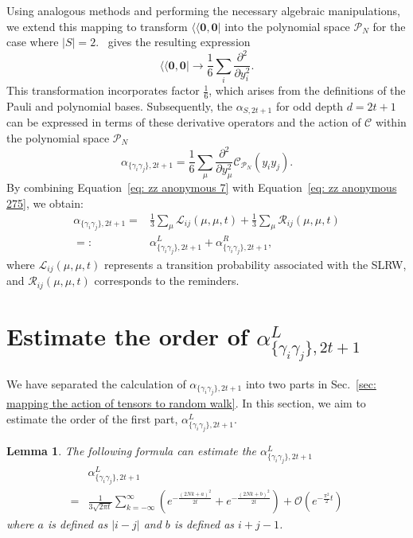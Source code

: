 \documentclass[showpacs,twocolumn,aps,prx,long bibliography,superscriptaddress,notitlepage]{revtex4-1}
\newtheorem{lemma}{Lemma}
\newcommand{\alpl}{\alpha_{\{\gamma_i\gamma_j\}, 2t+1}^{L}}
\newcommand{\supbra}[1]{\langle\langle #1 |}
\begin{document}
Using analogous methods and performing the necessary algebraic manipulations, we extend this mapping to transform \(\supbra{\bm{0}, \bm{0}}\) into the polynomial space \(\mathcal{P}_N\) for the case where \(|S| = 2\). \ gives the resulting expression \begin{equation}
    \supbra{\bm 0,\bm 0} \to \frac{1}{6} \sum_{i} \frac{\partial^2}{\partial y_i^2 }.
\end{equation}
This transformation incorporates factor \(\frac{1}{6}\), which arises from the definitions of the Pauli and polynomial bases. Subsequently, the \(\alpha_{S,2t+1}\) for odd depth \(d = 2t + 1\) can be expressed in terms of these derivative operators and the action of \(\mathcal{C}\) within the polynomial space \(\mathcal{P}_N\)
\begin{equation}
    \alpha_{\{\gamma_i\gamma_j\},2t+1} = \frac{1}{6} \sum_{\mu} \frac{\partial^2}{\partial y_\mu^2 } \mathcal{C}_{\mathcal{P}_N} (y_i y_j).
    \label{eq: zz anonymous 275}
\end{equation}
By combining Equation~\eqref{eq: zz anonymous 7} with Equation~\eqref{eq: zz anonymous 275}, we obtain:
\begin{align}
    \alpha_{\{\gamma_i\gamma_j\},2t+1} =& \frac{1}{3} \sum_\mu \mathscr{L}_{ij} (\mu, \mu, t) + \frac{1}{3} \sum_\mu \mathscr{R}_{ij} (\mu, \mu, t) \\
    =:&  \alpha_{\{\gamma_i\gamma_j\}, 2t+1}^{L} + \alpha_{\{\gamma_i\gamma_j\}, 2t+1}^{R},
    \label{eq: zz anonymous 24}
\end{align}
where \(\mathscr{L}_{ij} (\mu, \mu, t)\) represents a transition probability associated with the SLRW, and \(\mathscr{R}_{ij} (\mu, \mu, t)\) corresponds to the reminders. 

\section{Estimate the order of $\alpha_{\{\gamma_i\gamma_j\}, 2t+1}^{L}$}
\label{sec: estimate the order of alpl}
We have separated the calculation of $\alpha_{\{\gamma_i\gamma_j\},2t+1}$ into two parts in Sec.~\ref{sec: mapping the action of tensors to random walk}. In this section, we aim to estimate the order of the first part, $\alpl$.
\begin{lemma}
\label{theorem: order of alpha l}
    The following formula can estimate the $\alpl$
    \begin{equation}
        \begin{aligned}
            &\alpl  \\ =& \frac{1}{3\sqrt{2\pi t}}  \sum_{k=-\infty}^{\infty} \left(e^{-\frac{(2Nk+a)^2}{2t}} + e^{-\frac{(2Nk+b)^2}{2t}} \right)+\mathcal{O}\left(e^{-\frac{\pi^2}{2}t}\right)
        \end{aligned}
    \end{equation}
    where $a$ is defined as $|i-j|$ and $b$ is defined as $i+j-1$.
\end{lemma}
\end{document}
